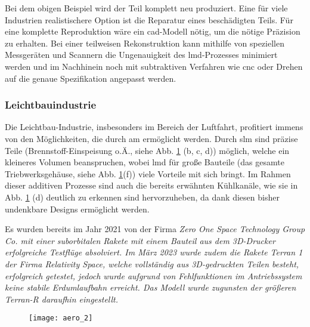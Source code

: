 \documentclass[../main.tex]{subfiles}
\begin{document}
Bei dem obigen Beispiel wird der Teil komplett neu produziert. 
Eine für viele Industrien realistischere Option ist die Reparatur eines beschädigten Teils. Für eine komplette Reproduktion wäre ein \acrshort{cad}-Modell nötig, um die nötige Präzision zu erhalten. 
Bei einer teilweisen Rekonstruktion kann mithilfe von speziellen Messgeräten und Scannern die Ungenauigkeit des \acrshort{lmd}-Prozesses minimiert werden und im Nachhinein noch mit subtraktiven Verfahren wie \acrfull{cnc} oder Drehen auf die genaue Spezifikation angepasst werden. 
\subsubsection{Leichtbauindustrie}
Die Leichtbau-Industrie, insbesonders im Bereich der Luftfahrt, profitiert immens von den Möglichkeiten, die durch \acrfull{am} ermöglicht werden. Durch \acrfull{slm} sind präzise Teile (Brennstoff-Einspeisung o.Ä., siehe Abb. \ref{img:aero_1} (b, c, d)) möglich, welche ein kleineres Volumen beanspruchen, wobei \acrfull{lmd} für große Bauteile (das gesamte Triebwerksgehäuse, siehe Abb. \ref{img:aero_1}(f)) viele Vorteile mit sich bringt. Im Rahmen dieser additiven Prozesse sind auch die bereits erwähnten Kühlkanäle, wie sie in Abb. \ref{img:aero_1} (d) deutlich zu erkennen sind hervorzuheben, da dank diesen bisher undenkbare Designs ermöglicht werden.

Es wurden bereits im Jahr 2021 von der Firma \it{Zero One Space Technology Group Co.} mit einer suborbitalen Rakete mit einem Bauteil aus dem 3D-Drucker erfolgreiche Testflüge absolviert. Im März 2023 wurde zudem die Rakete \it{Terran 1} der Firma \it{Relativity Space}, welche vollständig aus 3D-gedruckten Teilen besteht, erfolgreich getestet, jedoch wurde aufgrund von Fehlfunktionen im Antriebssystem keine stabile Erdumlaufbahn erreicht.\parencite{terran1_umlaufbahn} Das Modell wurde zugunsten der größeren \it{Terran-R} daraufhin eingestellt.\parencite{terran_r}


\begin{figure}[H]
	\centering
	\texttt{[image: aero\_2]}
	\label{img:aero_1}
\end{figure} 

\end{document}
